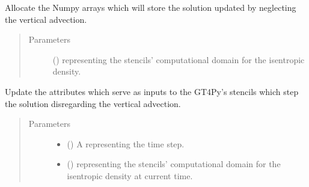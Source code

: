 \documentclass[letterpaper,10pt,english]{sphinxmanual}
\begin{document}
\begin{fulllineitems}
\begin{fulllineitems}
\label{\detokenize{api:dycore.prognostic_isentropic.PrognosticIsentropic._stencils_stepping_by_neglecting_vertical_advection_allocate_outputs}}
Allocate the Numpy arrays which will store the solution updated by neglecting the vertical advection.
\begin{quote}\begin{description}
\item[{Parameters}] \leavevmode
{} () \textendash{}  representing the stencils’ computational domain for the isentropic density.

\end{description}\end{quote}

\end{fulllineitems}


\begin{fulllineitems}
\label{\detokenize{api:dycore.prognostic_isentropic.PrognosticIsentropic._stencils_stepping_by_neglecting_vertical_advection_set_inputs}}
Update the attributes which serve as inputs to the GT4Py’s stencils which step the solution
disregarding the vertical advection.
\begin{quote}\begin{description}
\item[{Parameters}] \leavevmode\begin{itemize}
\item {} 
 () \textendash{} A  representing the time step.

\item {} 
 () \textendash{}  representing the stencils’ computational domain for the isentropic density
at current time.


\end{itemize}
\end{description}
\end{quote}
\end{fulllineitems}
\end{fulllineitems}
\end{document}
